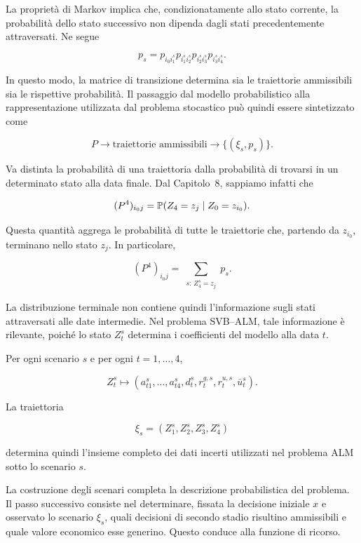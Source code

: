 La propriet\`a di Markov implica che, condizionatamente allo stato
corrente, la probabilit\`a dello stato successivo non dipenda dagli stati
precedentemente attraversati. Ne segue

\begin{equation}
p_s
=
p_{i_0i_1^s}
p_{i_1^si_2^s}
p_{i_2^si_3^s}
p_{i_3^si_4^s}.
\label{eq:cap14-probabilita-traiettoria}
\end{equation}

In questo modo, la matrice di transizione determina sia le traiettorie
ammissibili sia le rispettive probabilit\`a. Il passaggio dal modello
probabilistico alla rappresentazione utilizzata dal problema
stocastico pu\`o quindi essere sintetizzato come

\[
P
\longrightarrow
\text{traiettorie ammissibili}
\longrightarrow
\{(\xi_s,p_s)\}.
\]

Va distinta la probabilit\`a di una traiettoria dalla probabilit\`a di
trovarsi in un determinato stato alla data finale. Dal Capitolo~8,
sappiamo infatti che

\[
(P^4)_{i_0j}
=
\mathbb{P}(Z_4=z_j\mid Z_0=z_{i_0}).
\]

Questa quantit\`a aggrega le probabilit\`a di tutte le traiettorie che,
partendo da $z_{i_0}$, terminano nello stato $z_j$. In particolare,

\begin{equation}
(P^4)_{i_0j}
=
\sum_{\substack{s:\, Z_4^s=z_j}}
p_s.
\label{eq:cap14-probabilita-terminale}
\end{equation}

La distribuzione terminale non contiene quindi l'informazione sugli
stati attraversati alle date intermedie. Nel problema SVB--ALM, tale
informazione \`e rilevante, poich\'e lo stato $Z_t^s$ determina i
coefficienti del modello alla data $t$.

Per ogni scenario $s$ e per ogni $t=1,\ldots,4$,

\[
Z_t^s
\longmapsto
\left(
a_{t1}^s,\ldots,a_{t4}^s,
d_t^s,
r_t^{g,s},
r_t^{u,s},
\bar u_t^s
\right).
\]

La traiettoria

\[
\xi_s=(Z_1^s,Z_2^s,Z_3^s,Z_4^s)
\]

\noindent determina quindi l'insieme completo dei dati incerti utilizzati nel
problema ALM sotto lo scenario $s$.

La costruzione degli scenari completa la descrizione probabilistica del
problema. Il passo successivo consiste nel determinare, fissata la
decisione iniziale $x$ e osservato lo scenario $\xi_s$, quali decisioni
di secondo stadio risultino ammissibili e quale valore economico esse
generino. Questo conduce alla funzione di ricorso.

